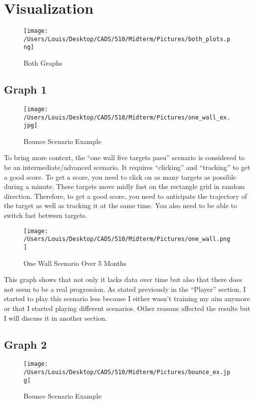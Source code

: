 \documentclass[
]{article}
\begin{document}
\section*{Visualization}

\begin{figure}
\centering
\texttt{[image: /Users/Louis/Desktop/CADS/510/Midterm/Pictures/both\_plots.png]}
\caption{Both Graphs}
\end{figure}

\subsection{Graph 1}

\begin{figure}
\centering
\texttt{[image: /Users/Louis/Desktop/CADS/510/Midterm/Pictures/one\_wall\_ex.jpg]}
\caption{Bounce Scenario Example}
\end{figure}

To bring more context, the ``one wall five targets pasu'' scenario is
considered to be an intermediate/advanced scenario. It requires
``clicking'' and ``tracking'' to get a good score. To get a score, you
need to click on as many targets as possible during a minute. These
targets move midly fast on the rectangle grid in random direction.
Therefore, to get a good score, you need to anticipate the trajectory of
the target as well as tracking it at the same time. You also need to be
able to switch fast between targets.

\begin{figure}
\centering
\texttt{[image: /Users/Louis/Desktop/CADS/510/Midterm/Pictures/one\_wall.png]}
\caption{One Wall Scenario Over 5 Months}
\end{figure}

This graph shows that not only it lacks data over time but also that
there does not seem to be a real progression. As stated previously in
the ``Player'' section, I started to play this scenario less because I
either wasn't training my aim anymore or that I started playing
different scenarios. Other reasons affected the results but I will
discuss it in another section.

\subsection{Graph 2}

\begin{figure}
\centering
\texttt{[image: /Users/Louis/Desktop/CADS/510/Midterm/Pictures/bounce\_ex.jpg]}
\caption{Bounce Scenario Example}
\end{figure}
\end{document}
